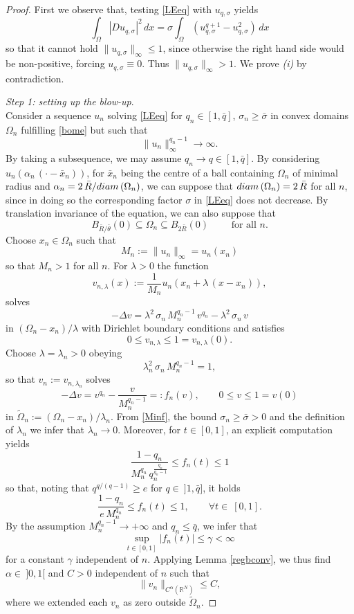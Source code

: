 \documentclass[12pt]{amsart}
\numberwithin{equation}{section}
\theoremstyle{plain}
\theoremstyle{plain}
\theoremstyle{plain}
\theoremstyle{definition}
\newcommand{\R}{{\mathbb R}}
\newcommand{\beq}{\begin{equation}}
\newcommand{\eeq}{\end{equation}}
\renewcommand{\le}{\leqslant}
\renewcommand{\ge}{\geqslant}
\begin{document}
\begin{proof}
First we observe that, testing \eqref{LEeq} with $u_{q,\sigma}$ yields
\[
 \int_\Omega |D u_{q, \sigma}|^2\, dx=\sigma \int_\Omega \left(u_{q, \sigma}^{q+1}-u_{q,\sigma}^2\right)\, dx
\]
 so that it cannot hold $\|u_{q, \sigma}\|_\infty\le 1$, since otherwise the right hand side would be non-positive, forcing $u_{q, \sigma}\equiv 0$. 
Thus $\|u_{q, \sigma}\|_\infty> 1$.
We prove {\em (i)} by contradiction. 

\smallskip
{\em Step 1: setting up the blow-up}.\\
Consider a sequence $u_n$ solving \eqref{LEeq} for $q_n\in [1, \bar q]$, $\sigma_n\ge \bar\sigma$ in convex domains $\Omega_n$ fulfilling \eqref{bome} 
 but such that 
\beq
\label{Minf}
 \|u_n\|_\infty^{q_n-1}\to \infty.
\eeq
By taking a subsequence, we may assume $q_n\to q\in [1, \bar q]$.
By considering $u_n(\alpha_n\, (\cdot-\bar x_n))$, for $\bar x_n$ being the centre of a ball containing $\Omega_n$ of minimal radius and $\alpha_n=2\, \bar R/{\rm diam}\, (\Omega_n)$, we can suppose that ${\rm diam}\, (\Omega_n)=2\, \bar R$ for all $n$, since in doing so the corresponding factor $\sigma$ in \eqref{LEeq} does not decrease.
By translation invariance of the equation, we can also suppose that 
\beq
\label{condpalle}
B_{\bar R/\bar\theta}(0)\subseteq \Omega_n\subseteq B_{2\bar R}(0)\qquad \text{ for all $n$}.
\eeq
Choose $x_n\in \Omega_n$ such that
\[
M_n:=\|u_n\|_\infty=u_n(x_n)
\]
so that $M_n>1$ for all $n$. 
For $\lambda>0$ the function
\beq
\label{defvnl}
 v_{n, \lambda}(x) :=\frac{1}{M_n} u_n(x_n+\lambda\, (x-x_n)), 
 \eeq
 solves 
 \[
 -\Delta v= \lambda^2\, \sigma_n\, M_n^{q_n-1}\, v^{q_n}-\lambda^2\, \sigma_n\, v
 \]
 in $ \left(\Omega_n-x_n\right)/\lambda$ 
 with Dirichlet boundary conditions and satisfies 
 \[
 0\le v_{n, \lambda}\le 1=v_{n, \lambda}(0).
 \] 
 Choose $\lambda=\lambda_n>0$ obeying 
 \[
 \lambda_n^2 \, \sigma_n\, M_n^{q_n-1} =1,
 \]
 so that $v_n:=v_{n, \lambda_n}$ solves
 \beq
 \label{eqsc}
 -\Delta v= v^{q_n}-\frac{v}{M_n^{q_n-1}}=: f_n(v), \qquad 0\le v\le 1=v(0)
 \eeq
 in $\widetilde{\Omega}_n :=\left(\Omega_n-x_n\right)/\lambda_n$. 
From \eqref{Minf}, the bound $\sigma_n\ge \bar\sigma>0$ and the definition of $\lambda_n$ we infer that $\lambda_n\to 0$. 
Moreover, for $t\in [0, 1]$, an explicit computation yields
 \[
 \frac{1-q_n}{M_n^{q_n}\, q_n^{\frac{q_n}{q_n-1}}}\le f_n(t)\le 1
 \]
so that, noting that $q^{q/(q-1)}\ge e$ for $q\in \ ]1, \bar q]$, it holds
\[
\frac{1-q_n}{e\, M_n^{q_n}}\le f_{n}(t)\le 1, \qquad \forall t\in \ [0, 1].
\]
By the assumption $M_n^{q_n-1}\to +\infty$ and $q_n\le \bar q$, we infer that
 \[
 \sup_{t\in [0, 1]} |f_n(t)|\le \gamma<\infty
 \]
 for a constant $\gamma$ independent of $n$. 
Applying Lemma \ref{regbconv}, we thus find $\alpha\in \ ]0, 1[$ and $C>0$ independent of $n$ such that 
 \beq
 \label{equilip}
 \|v_n\|_{C^\alpha(\R^N)} \le C,
 \eeq
 where we extended each $v_n$ as zero outside $\widetilde{\Omega}_n$.
 

\end{proof}
\end{document}
